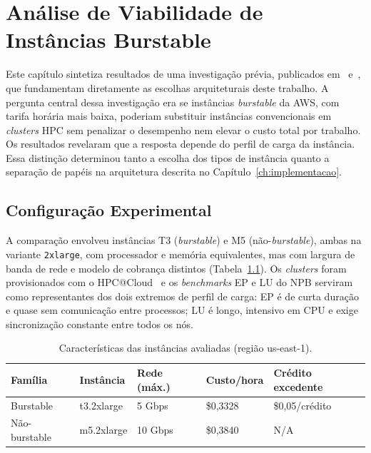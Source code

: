 \chapter{Análise de Viabilidade de Instâncias Burstable}
\label{ch:burstable}

Este capítulo sintetiza resultados de uma investigação prévia, publicados
em~\cite{soda2025erad} e~\cite{soda2025wcc}, que fundamentam diretamente as escolhas
arquiteturais deste trabalho. A pergunta central dessa investigação era se instâncias
\textit{burstable} da AWS, com tarifa horária mais baixa, poderiam substituir instâncias
convencionais em \textit{clusters} HPC sem penalizar o desempenho nem elevar o custo total
por trabalho. Os resultados revelaram que a resposta depende do perfil de carga da instância.
Essa distinção determinou tanto a escolha dos tipos de instância quanto a separação de papéis
na arquitetura descrita no Capítulo~\ref{ch:implementacao}.

\section{Configuração Experimental}
\label{sec:burstable-config}

A comparação envolveu instâncias T3 (\textit{burstable}) e M5 (não-\textit{burstable}), ambas
na variante \texttt{2xlarge}, com processador e memória equivalentes, mas com largura de banda
de rede e modelo de cobrança distintos (Tabela~\ref{tab:burstable-instancias}). Os \textit{clusters}
foram provisionados com o HPC@Cloud~\cite{munhoz2024hpccloud} e os \textit{benchmarks} EP e LU do NPB
serviram como representantes dos dois extremos de perfil de carga: EP é de curta duração e
quase sem comunicação entre processos; LU é longo, intensivo em CPU e exige sincronização
constante entre todos os nós.

\begin{table}[htb]
  \centering
  \caption{Características das instâncias avaliadas (região us-east-1).}
  \label{tab:burstable-instancias}
  \begin{tabular}{l l l l l}
    \toprule
    \textbf{Família} & \textbf{Instância} & \textbf{Rede (máx.)} & \textbf{Custo/hora} & \textbf{Crédito excedente} \\
    \midrule
    Burstable     & t3.2xlarge & 5 Gbps  & \$0,3328 & \$0,05/crédito \\
    Não-burstable & m5.2xlarge & 10 Gbps & \$0,3840 & N/A \\
    \bottomrule
  \end{tabular}
\end{table}

